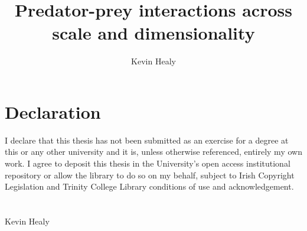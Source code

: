 \documentclass[singelsided,12pt]{mythesis} %
\title{Predator-prey interactions across scale and dimensionality}
\author{Kevin Healy}
\begin{document}

\maketitle %

\chapter*{Declaration}
I declare that this thesis has not been submitted as an exercise for a degree at this or any other university and it is, unless otherwise referenced, entirely my own work.
I agree to deposit this thesis in the University's open access institutional repository or allow the library to do so on my behalf, subject to Irish Copyright Legislation and Trinity College Library conditions of use and acknowledgement.
\\
\\
\\
Kevin Healy


\vspace{10 mm}

\allcontents %
\cleardoublepage
\mainbody


		


 





\formatappendices


\end{document}
